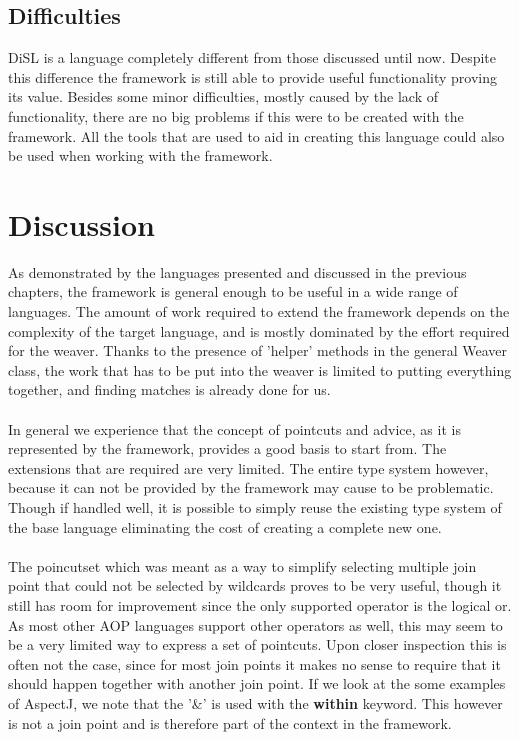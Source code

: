 \documentclass[a4paper]{report}
\begin{document}
\section{Difficulties}
DiSL is a language completely different from those discussed until now. Despite this difference the framework is still able to provide useful functionality proving its value. Besides some minor difficulties, mostly caused by the lack of functionality, there are no big problems if this were to be created with the framework. All the tools that are used to aid in creating this language could also be used when working with the framework.

\chapter{Discussion}
\label{chap:Discussion}
As demonstrated by the languages presented and discussed in the previous chapters, the framework is general enough to be useful in a wide range of languages. The amount of work required to extend the framework depends on the complexity of the target language, and is mostly dominated by the effort required for the weaver. Thanks to the presence of 'helper' methods in the general Weaver class, the work that has to be put into the weaver is limited to putting everything together, and finding matches is already done for us.\\
\\
In general we experience that the concept of pointcuts and advice, as it is represented by the framework, provides a good basis to start from. The extensions that are required are very limited. The entire type system however, because it can not be provided by the framework may cause to be problematic. Though if handled well, it is possible to simply reuse the existing type system of the base language eliminating the cost of creating a complete new one.\\
\\
The poincutset which was meant as a way to simplify selecting multiple join point that could not be selected by wildcards proves to be very useful, though it still has room for improvement since the only supported operator is the logical or. As most other AOP languages support other operators as well, this may seem to be a very limited way to express a set of pointcuts. Upon closer inspection this is often not the case, since for most join points it makes no sense to require that it should happen together with another join point. If we look at the some examples of AspectJ, we note that the '\&' is used with the \textbf{within} keyword. This however is not a join point and is therefore part of the context in the framework.\\
\end{document}
